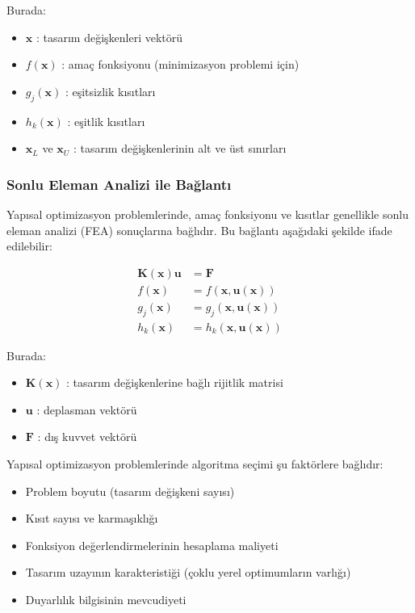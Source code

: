 Burada:
\begin{itemize}
    \item $\mathbf{x}$ : tasarım değişkenleri vektörü
    \item $f(\mathbf{x})$ : amaç fonksiyonu (minimizasyon problemi için)
    \item $g_j(\mathbf{x})$ : eşitsizlik kısıtları
    \item $h_k(\mathbf{x})$ : eşitlik kısıtları
    \item $\mathbf{x}_L$ ve $\mathbf{x}_U$ : tasarım değişkenlerinin alt ve üst sınırları
\end{itemize}

\subsubsection{Sonlu Eleman Analizi ile Bağlantı}
Yapısal optimizasyon problemlerinde, amaç fonksiyonu ve kısıtlar genellikle sonlu eleman analizi (FEA) sonuçlarına bağlıdır. Bu bağlantı aşağıdaki şekilde ifade edilebilir:

\begin{align}
\mathbf{K}(\mathbf{x}) \mathbf{u} &= \mathbf{F} \\
f(\mathbf{x}) &= f(\mathbf{x}, \mathbf{u}(\mathbf{x})) \\
g_j(\mathbf{x}) &= g_j(\mathbf{x}, \mathbf{u}(\mathbf{x})) \\
h_k(\mathbf{x}) &= h_k(\mathbf{x}, \mathbf{u}(\mathbf{x}))
\end{align}

Burada:
\begin{itemize}
    \item $\mathbf{K}(\mathbf{x})$ : tasarım değişkenlerine bağlı rijitlik matrisi
    \item $\mathbf{u}$ : deplasman vektörü
    \item $\mathbf{F}$ : dış kuvvet vektörü
\end{itemize}

\begin{tcolorbox}[title=Yapısal Optimizasyon Algoritması Seçimi]
Yapısal optimizasyon problemlerinde algoritma seçimi şu faktörlere bağlıdır:
\begin{itemize}
    \item Problem boyutu (tasarım değişkeni sayısı)
    \item Kısıt sayısı ve karmaşıklığı
    \item Fonksiyon değerlendirmelerinin hesaplama maliyeti
    \item Tasarım uzayının karakteristiği (çoklu yerel optimumların varlığı)
    \item Duyarlılık bilgisinin mevcudiyeti
\end{itemize}
\end{tcolorbox}




